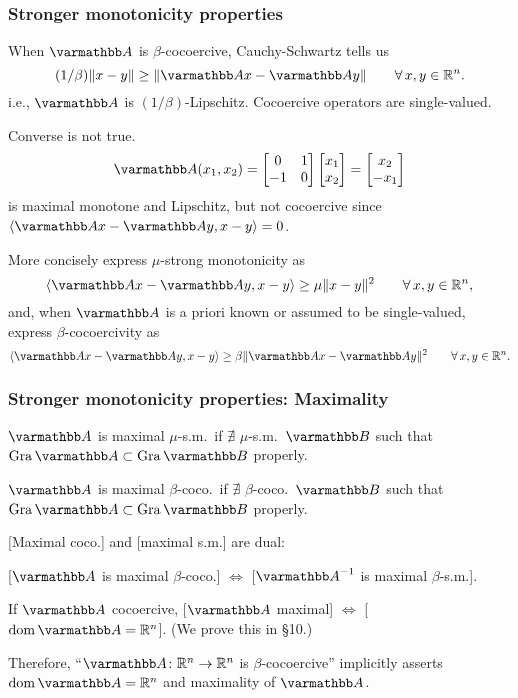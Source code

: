 \documentclass[10pt,mathserif]{beamer}
\begin{document}
\begin{frame}[plain]
\frametitle{Stronger monotonicity properties}
When $\opA $ is $\beta$-cocoercive, Cauchy-Schwartz tells us
\[
(1/\beta)\|x-y\|\geq  \|\opA x-\opA y\|\qquad \forall\, x,y\in\reals^n.
\]
i.e., $\opA $ is $(1/\beta)$-Lipschitz. Cocoercive operators are single-valued.



\vspace{0.2in}
Converse is not true. %
\[
\opA (x_1,x_2)=\begin{bmatrix}
0&1\\
-1&0
\end{bmatrix}
\begin{bmatrix}
x_1\\x_2
\end{bmatrix}=
\begin{bmatrix}
x_2\\-x_1
\end{bmatrix}
\]
is maximal monotone and Lipschitz, but not cocoercive since $\langle \opA x-\opA y, x-y\rangle = 0$.


\vspace{0.2in}
More concisely express $\mu$-strong monotonicity as
\[
\langle \opA x-\opA y, x-y\rangle \geq \mu \|x-y\|^2
\qquad \forall\, x,y\in\reals^n,
\]
and, when $\opA$ is a priori known or assumed to be single-valued, express $\beta$-cocoercivity as
\[
\langle \opA x-\opA y, x-y\rangle \geq \beta \|\opA x-\opA y\|^2
\qquad \forall\, x,y\in\reals^n.
\]

\end{frame}


\begin{frame}
\frametitle{Stronger monotonicity properties: Maximality}
$\opA $ is maximal $\mu$-s.m.\ if $\nexists$ $\mu$-s.m.\ $\opB$ such that $\gra \opA \subset \gra \opB$ properly.

$\opA $ is maximal $\beta$-coco.\ if $\nexists$ $\beta$-coco.\ $\opB$ such that $\gra \opA \subset \gra \opB$ properly.

\vspace{0.2in}


[Maximal coco.] and [maximal s.m.] are dual:

[$\opA $ is maximal $\beta$-coco.] $\Leftrightarrow$ [$\opA ^{-1}$ is maximal $\beta$-s.m.].

\vspace{0.2in}
If $\opA$ cocoercive,
[$\opA$ maximal] $\Leftrightarrow$ [$\dom \opA=\reals^n$].
(We prove this in \S10.)

Therefore,
``$\opA\colon\reals^n\rightarrow \reals^n$ is $\beta$-cocoercive''
implicitly asserts $\dom \opA=\reals^n$ and maximality of $\opA$.
\end{frame}
\end{document}

